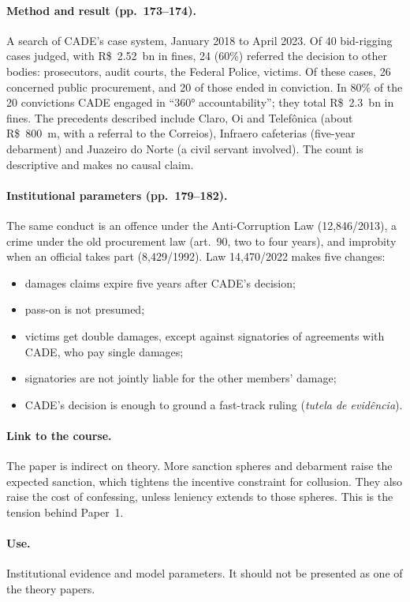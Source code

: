 \documentclass[11pt,a4paper]{article}
\begin{document}
\paragraph{Method and result (pp.\ 173--174).} A search of CADE's case system, January 2018 to
April 2023. Of 40 bid-rigging cases judged, with R\$~2.52~bn in fines, 24 (60\%) referred the
decision to other bodies: prosecutors, audit courts, the Federal Police, victims. Of these cases, 26
concerned public procurement, and 20 of those ended in conviction. In 80\% of the 20 convictions
CADE engaged in ``360° accountability''; they total R\$~2.3~bn in fines. The precedents described
include Claro, Oi and Telefônica (about R\$~800~m, with a referral to the Correios), Infraero
cafeterias (five-year debarment) and Juazeiro do Norte (a civil servant involved). The count is
descriptive and makes no causal claim.

\paragraph{Institutional parameters (pp.\ 179--182).} The same conduct is an offence under the
Anti-Corruption Law (12,846/2013), a crime under the old procurement law (art.\ 90, two to four
years), and improbity when an official takes part (8,429/1992). Law 14,470/2022 makes five changes:
\begin{itemize}
\item damages claims expire five years after CADE's decision;
\item pass-on is not presumed;
\item victims get double damages, except against signatories of agreements with CADE, who pay single damages;
\item signatories are not jointly liable for the other members' damage;
\item CADE's decision is enough to ground a fast-track ruling (\emph{tutela de evidência}).
\end{itemize}

\paragraph{Link to the course.} The paper is indirect on theory. More sanction spheres and
debarment raise the expected sanction, which tightens the incentive constraint for collusion.
They also raise the cost of confessing, unless leniency extends to those spheres. This is the
tension behind Paper~1.

\paragraph{Use.} Institutional evidence and model parameters. It should not be presented as one of
the theory papers.
\end{document}
